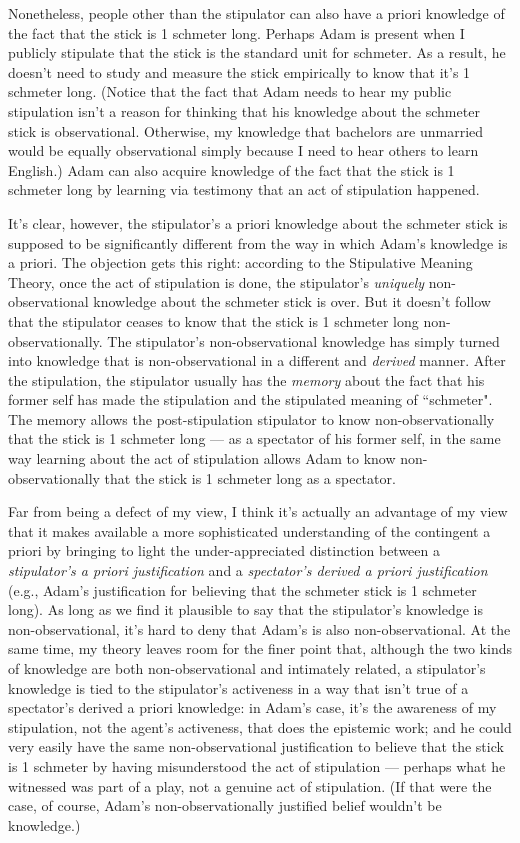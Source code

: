 \documentclass[a4paper,12pt]{article}
\begin{document}
Nonetheless, people other than the stipulator can also have a priori knowledge of the fact that the stick is 1 schmeter long. Perhaps Adam is present when I publicly stipulate that the stick is the standard unit for schmeter. As a result, he doesn't need to study and measure the stick empirically to know that it's 1 schmeter long. (Notice that the fact that Adam needs to hear my public stipulation isn't a reason for thinking that his knowledge about the schmeter stick is observational. Otherwise, my knowledge that bachelors are unmarried would be equally observational simply because I need to hear others to learn English.) Adam can also acquire knowledge of the fact that the stick is 1 schmeter long by learning via testimony that an act of stipulation happened.

It's clear, however, the stipulator's a priori knowledge about the schmeter stick is supposed to be significantly different from the way in which Adam's knowledge is a priori. The objection gets this right: according to the Stipulative Meaning Theory, once the act of stipulation is done, the stipulator's \emph{uniquely} non-observational knowledge about the schmeter stick is over. But it doesn't follow that the stipulator ceases to know that the stick is 1 schmeter long non-observationally. The stipulator's non-observational knowledge has simply turned into knowledge that is non-observational in a different and \emph{derived} manner. After the stipulation, the stipulator usually has the \emph{memory} about the fact that his former self has made the stipulation and the stipulated meaning of ``schmeter". The memory allows the post-stipulation stipulator to know non-observationally that the stick is 1 schmeter long --- as a spectator of his former self, in the same way learning about the act of stipulation allows Adam to know non-observationally that the stick is 1 schmeter long as a spectator.

Far from being a defect of my view, I think it's actually an advantage of my view that it makes available a more sophisticated understanding of the contingent a priori by bringing to light the under-appreciated distinction between a \emph{stipulator's a priori justification} and a \emph{spectator's derived a priori justification} (e.g., Adam's justification for believing that the schmeter stick is 1 schmeter long). As long as we find it plausible to say that the stipulator's knowledge is non-observational, it's hard to deny that Adam's is also non-observational. At the same time, my theory leaves room for the finer point that, although the two kinds of knowledge are both non-observational and intimately related, a stipulator's knowledge is tied to the stipulator's activeness in a way that isn't true of a spectator's derived a priori knowledge: in Adam's case, it's the awareness of my stipulation, not the agent's activeness, that does the epistemic work; and he could very easily have the same non-observational justification to believe that the stick is 1 schmeter by having misunderstood the act of stipulation --- perhaps what he witnessed was part of a play, not a genuine act of stipulation. (If that were the case, of course, Adam's non-observationally justified belief wouldn't be knowledge.)
\end{document}
